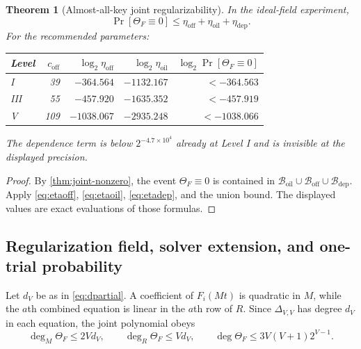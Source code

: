 \documentclass[10pt,a4paper]{article}
\newtheorem{theorem}{Theorem}[section]
\newcommand{\cB}{\mathcal B}
\newcommand{\oil}{\mathrm{oil}}
\newcommand{\off}{\mathrm{off}}
\newcommand{\dep}{\mathrm{dep}}
\begin{document}
\begin{theorem}[Almost-all-key joint regularizability]\label{thm:key-density}
In the ideal-field experiment,
\begin{equation}\label{eq:keybad-total}
\Pr[\Theta_F\equiv0]
\le\eta_{\off}+\eta_{\oil}+\eta_{\dep}.
\end{equation}
For the recommended parameters:
\begin{center}
\begin{tabular}{@{}lrrrr@{}}
\toprule
Level & $c_{\off}$ & $\log_2\eta_{\off}$ & $\log_2\eta_{\oil}$ & $\log_2\Pr[\Theta_F\equiv0]$\\
\midrule
I   & 39  & $-364.564$  & $-1132.167$ & $<-364.563$\\
III & 55  & $-457.920$  & $-1635.352$ & $<-457.919$\\
V   & 109 & $-1038.067$ & $-2935.248$ & $<-1038.066$\\
\bottomrule
\end{tabular}
\end{center}
The dependence term is below $2^{-4.7\times10^4}$ already at Level I and is invisible at the displayed precision.
\end{theorem}

\begin{proof}
By \cref{thm:joint-nonzero}, the event $\Theta_F\equiv0$ is contained in $\cB_{\oil}\cup\cB_{\off}\cup\cB_{\dep}$.  Apply \eqref{eq:etaoff}, \eqref{eq:etaoil}, \eqref{eq:etadep}, and the union bound.  The displayed values are exact evaluations of those formulas.
\end{proof}

\subsection{Regularization field, solver extension, and one-trial probability}

Let $d_V$ be as in \eqref{eq:dpartial}.  A coefficient of $F_i(Mt)$ is quadratic in $M$, while the $a$th combined equation is linear in the $a$th row of $R$.  Since $\Delta_{V,V}$ has degree $d_V$ in each equation, the joint polynomial obeys
\begin{equation}\label{eq:joint-degrees}
\deg_M\Theta_F\le2Vd_V,
\qquad
\deg_R\Theta_F\le Vd_V,
\qquad
\deg\Theta_F\le3V(V+1)2^{V-1}.
\end{equation}
\end{document}
